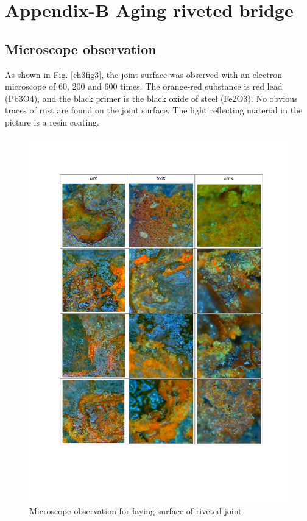 \chapter{Appendix-B Aging riveted bridge}
\label{app2}
\onehalfspacing


\section{Microscope observation}\label{app-obsur}

As shown in Fig. \ref{ch3fig3}, the joint surface was observed with an electron microscope of 60, 200 and 600 times. The orange-red substance is red lead (Pb3O4), and the black primer is the black oxide of steel (Fe2O3). No obvious traces of rust are found on the joint surface. The light reflecting material in the picture is a resin coating.

\begin{figure}
    \centering
    \includegraphics[width=1\linewidth]{imgs//app2/fig-ob-surface.pdf}
    \caption{Microscope observation for faying surface of riveted joint}
    \label{fig-obsur}
\end{figure}



